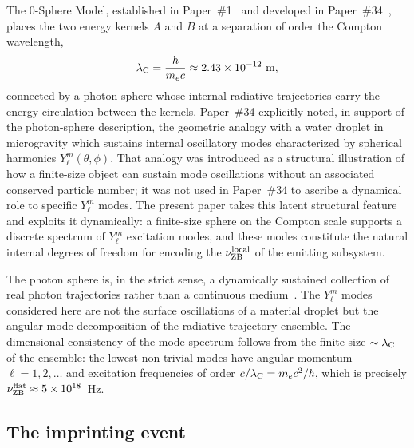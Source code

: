 \documentclass[%
 reprint, amsmath,amssymb, aps, prb, ]{revtex4-2}
\numberwithin{equation}{section}
\newcommand{\nuZBl}{\nu_{\text{ZB}}^{\rm local}}
\newcommand{\nuZBf}{\nu_{\text{ZB}}^{\rm flat}}
\newcommand{\lambdaC}{\lambda_{\rm C}}
\begin{document}
The 0-Sphere Model, established in Paper~\#1~\cite{hanamura01} and developed in Paper~\#34~\cite{hanamura34}, places the two energy kernels $A$ and $B$ at a separation of order the Compton wavelength,
\begin{equation}
\lambdaC = \frac{\hbar}{m_e c} \approx 2.43 \times 10^{-12}\ \text{m},
\label{eq:compton}
\end{equation}
connected by a photon sphere whose internal radiative trajectories carry the energy circulation between the kernels. Paper~\#34 explicitly noted, in support of the photon-sphere description, the geometric analogy with a water droplet in microgravity which sustains internal oscillatory modes characterized by spherical harmonics $Y_\ell^m(\theta,\phi)$. That analogy was introduced as a structural illustration of how a finite-size object can sustain mode oscillations without an associated conserved particle number; it was not used in Paper~\#34 to ascribe a dynamical role to specific $Y_\ell^m$ modes. The present paper takes this latent structural feature and exploits it dynamically: a finite-size sphere on the Compton scale supports a discrete spectrum of $Y_\ell^m$ excitation modes, and these modes constitute the natural internal degrees of freedom for encoding the $\nuZBl$ of the emitting subsystem.

The photon sphere is, in the strict sense, a dynamically sustained collection of real photon trajectories rather than a continuous medium~\cite{hanamura34}. The $Y_\ell^m$ modes considered here are not the surface oscillations of a material droplet but the angular-mode decomposition of the radiative-trajectory ensemble. The dimensional consistency of the mode spectrum follows from the finite size $\sim\lambdaC$ of the ensemble: the lowest non-trivial modes have angular momentum $\ell = 1, 2, \ldots$ and excitation frequencies of order $c/\lambdaC = m_e c^2/\hbar$, which is precisely $\nuZBf \approx 5\times 10^{18}$~Hz.

\subsection{The imprinting event}
\end{document}

